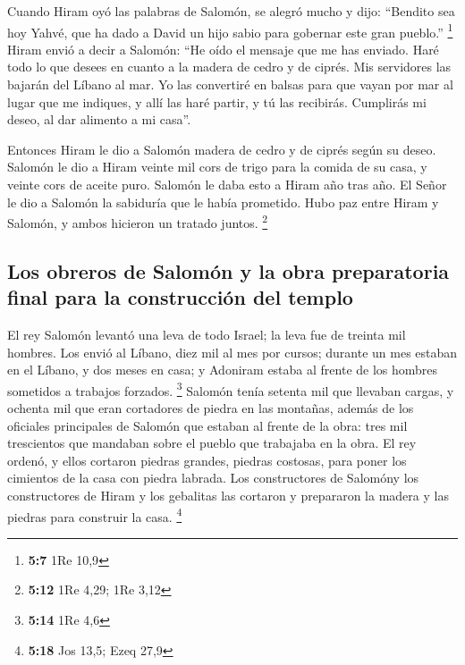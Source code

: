  Cuando Hiram oyó las palabras de Salomón, se alegró mucho
y dijo: ``Bendito sea hoy Yahvé, que ha dado a David un hijo sabio para
gobernar este gran pueblo.'' \footnote{\textbf{5:7} 1Re 10,9}
 Hiram envió a decir a Salomón: ``He oído el mensaje que
me has enviado. Haré todo lo que desees en cuanto a la madera de cedro y
de ciprés.  Mis servidores las bajarán del Líbano al mar.
Yo las convertiré en balsas para que vayan por mar al lugar que me
indiques, y allí las haré partir, y tú las recibirás. Cumplirás mi
deseo, al dar alimento a mi casa''.

 Entonces Hiram le dio a Salomón madera de cedro y de
ciprés según su deseo.  Salomón le dio a Hiram veinte mil
cors de trigo para la comida de su casa, y veinte cors de aceite puro.
Salomón le daba esto a Hiram año tras año.  El Señor le
dio a Salomón la sabiduría que le había prometido. Hubo paz entre Hiram
y Salomón, y ambos hicieron un tratado juntos. \footnote{\textbf{5:12}
  1Re 4,29; 1Re 3,12}

\hypertarget{los-obreros-de-salomuxf3n-y-la-obra-preparatoria-final-para-la-construcciuxf3n-del-templo}{%
\subsection{Los obreros de Salomón y la obra preparatoria final para la
construcción del
templo}\label{los-obreros-de-salomuxf3n-y-la-obra-preparatoria-final-para-la-construcciuxf3n-del-templo}}

 El rey Salomón levantó una leva de todo Israel; la leva
fue de treinta mil hombres.  Los envió al Líbano, diez
mil al mes por cursos; durante un mes estaban en el Líbano, y dos meses
en casa; y Adoniram estaba al frente de los hombres sometidos a trabajos
forzados. \footnote{\textbf{5:14} 1Re 4,6}  Salomón tenía
setenta mil que llevaban cargas, y ochenta mil que eran cortadores de
piedra en las montañas,  además de los oficiales
principales de Salomón que estaban al frente de la obra: tres mil
trescientos que mandaban sobre el pueblo que trabajaba en la obra.
 El rey ordenó, y ellos cortaron piedras grandes, piedras
costosas, para poner los cimientos de la casa con piedra labrada.
 Los constructores de Salomóny los constructores de Hiram
y los gebalitas las cortaron y prepararon la madera y las piedras para
construir la casa. \footnote{\textbf{5:18} Jos 13,5; Ezeq 27,9}

